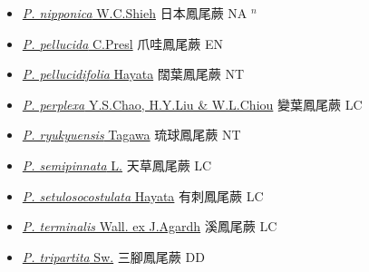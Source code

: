 \begin{itemize}
\begin{itemize}
        \item[] \href{http://www.theplantlist.org/tpl1.1/search?q=Pteris+nipponica}{\textit{P. nipponica} W.C.Shieh}   日本鳳尾蕨 NA $^n$
        \item[] \href{http://www.theplantlist.org/tpl1.1/search?q=Pteris+pellucida}{\textit{P. pellucida} C.Presl}     爪哇鳳尾蕨 EN
        \item[] \href{http://www.theplantlist.org/tpl1.1/search?q=Pteris+pellucidifolia}{\textit{P. pellucidifolia} Hayata}   闊葉鳳尾蕨 NT
        \item[] \href{http://www.theplantlist.org/tpl1.1/search?q=Pteris+perplexa}{\textit{P. perplexa} Y.S.Chao, H.Y.Liu \& W.L.Chiou}   變葉鳳尾蕨 LC
        \item[] \href{http://www.theplantlist.org/tpl1.1/search?q=Pteris+ryukyuensis}{\textit{P. ryukyuensis} Tagawa}   琉球鳳尾蕨 NT
        \item[] \href{http://www.theplantlist.org/tpl1.1/search?q=Pteris+semipinnata}{\textit{P. semipinnata} L.}     天草鳳尾蕨 LC
        \item[] \href{http://www.theplantlist.org/tpl1.1/search?q=Pteris+setulosocostulata}{\textit{P. setulosocostulata} Hayata}   有刺鳳尾蕨 LC
        \item[] \href{http://www.theplantlist.org/tpl1.1/search?q=Pteris+terminalis}{\textit{P. terminalis} Wall. ex J.Agardh}     溪鳳尾蕨 LC
        \item[] \href{http://www.theplantlist.org/tpl1.1/search?q=Pteris+tripartita}{\textit{P. tripartita} Sw.}   三腳鳳尾蕨 DD

\end{itemize}
\end{itemize}
